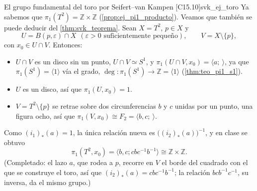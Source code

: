 \begin{observacion}{El grupo fundamental del toro por Seifert--van Kampen [C15.10]}{svk_ej_toro}
Ya sabemos que $\pi_1(T^2) = \mathbb{Z} \times \mathbb{Z}$ (\cref{prop:ej_pi1_producto}). Veamos que también se puede deducir del \cref{thm:svk_teorema}. Sean $X = T^2$, $p \in X$ y
\[ U = B(p, \varepsilon) \cap X \ \ (\varepsilon > 0 \text{ suficientemente pequeño}), \qquad V = X \setminus \{p\}, \]
con $x_0 \in U \cap V$. Entonces:
\begin{itemize}
    \item $U \cap V$ es un disco sin un punto, $U \cap V \simeq S^1$, y $\pi_1(U \cap V, x_0) = \langle a ; \ \rangle$, ya que $\pi_1(S^1) = \langle 1 \rangle$ vía el grado, $\deg \colon \pi_1(S^1) \to \mathbb{Z} = \langle 1 \rangle$ (\cref{thm:teo_pi1_s1}).
    \item $U$ es un disco, así que $\pi_1(U, x_0) = 1$.
    \item $V = T^2 \setminus \{p\}$ se retrae sobre dos circunferencias $b$ y $c$ unidas por un punto, una figura ocho, así que $\pi_1(V, x_0) \cong F_2 = \langle b, c ; \ \rangle$.
\end{itemize}
Como $(i_1)_*(a) = 1$, la única relación nueva es $\big((i_2)_*(a)\big)^{-1}$, y en clase se obtuvo
\[ \pi_1(T^2, x_0) = \langle b, c ; cbc^{-1}b^{-1} \rangle \cong \mathbb{Z} \times \mathbb{Z}. \]
(Completado: el lazo $a$, que rodea a $p$, recorre en $V$ el borde del cuadrado con el que se construye el toro, así que $(i_2)_*(a) = cbc^{-1}b^{-1}$; la relación $bcb^{-1}c^{-1}$, su inversa, da el mismo grupo.)
\begin{center}
\begin{minipage}{\linewidth}
\centering
{}
\end{minipage}
\end{center}
\end{observacion}
